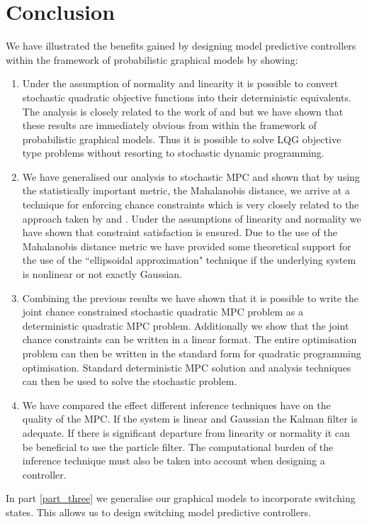 \section{Conclusion}
We have illustrated the benefits gained by designing model predictive controllers within the framework of probabilistic graphical models by showing:
\begin{enumerate}
\item
Under the assumption of normality and linearity it is possible to convert stochastic quadratic objective functions into their deterministic equivalents. The analysis is closely related to the work of \cite{yan1} and \cite{yan2} but we have shown that these results are immediately obvious from within the framework of probabilistic graphical models. Thus it is possible to solve LQG objective type problems without resorting to stochastic dynamic programming.
\item
We have generalised our analysis to stochastic MPC and shown that by using the statistically important metric, the Mahalanobis distance, we arrive at a technique for enforcing chance constraints which is very closely related to the approach taken by \cite{vanhessem2} and \cite{vanhessem1}. Under the assumptions of linearity and normality we have shown that constraint satisfaction is ensured. Due to the use of the Mahalanobis distance metric we have provided some theoretical support for the use of the ``ellipsoidal approximation" technique if the underlying system is nonlinear or not exactly Gaussian.
\item
Combining the previous results we have shown that it is possible to write the joint chance constrained stochastic quadratic MPC problem as a deterministic quadratic MPC problem. Additionally we show that the joint chance constraints can be written in a linear format. The entire optimisation problem can then be written in the standard form for quadratic programming optimisation. Standard deterministic MPC solution and analysis techniques can then be used to solve the stochastic problem.
\item
We have compared the effect different inference techniques have on the quality of the MPC. If the system is linear and Gaussian the Kalman filter is adequate. If there is significant departure from linearity or normality it can be beneficial to use the particle filter. The computational burden of the inference technique must also be taken into account when designing a controller.
\end{enumerate}
In part \ref{part_three} we generalise our graphical models to incorporate switching states. This allows us to design switching model predictive controllers.